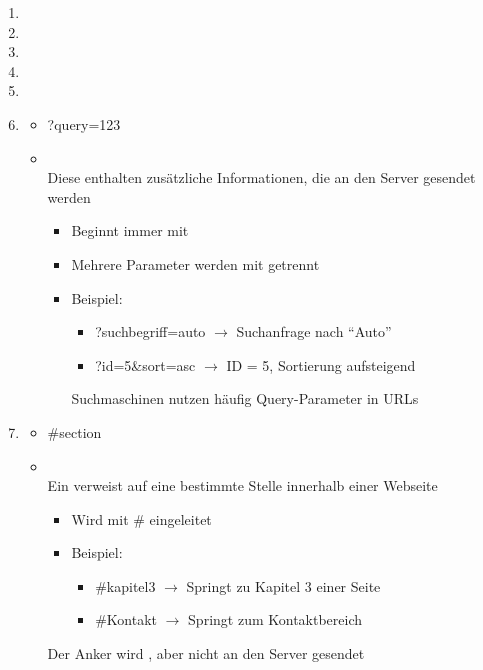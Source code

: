 \begin{infoBox}
    \begin{enumerate}
        \item {}
        \item {}
        \item {}
        \item {}
        \item {}
        \item {}
        \begin{itemize}
            \item {} ?query=123
            \item {}\\
            Diese  enthalten zusätzliche Informationen, die an den Server gesendet werden
            \begin{itemize}
                \item Beginnt immer mit 
                \item Mehrere Parameter werden mit \fatsf{\&} getrennt
                \item Beispiel:
                \begin{itemize}
                    \item ?suchbegriff=auto $\rightarrow$ Suchanfrage nach \enquote{Auto}
                    \item ?id=5\&sort=asc $\rightarrow$ ID = 5, Sortierung aufsteigend
                \end{itemize}
                Suchmaschinen nutzen häufig Query-Parameter in URLs
            \end{itemize}
        \end{itemize}
        \item {}
        \begin{itemize}
            \item {} \#section
            \item {}\\
            Ein  verweist auf eine bestimmte Stelle innerhalb einer Webseite
            \begin{itemize}
                \item Wird mit \# eingeleitet
                \item Beispiel:
                \begin{itemize}
                    \item \#kapitel3 $\rightarrow$ Springt zu Kapitel 3 einer Seite
                    \item \#Kontakt $\rightarrow$ Springt zum Kontaktbereich
                \end{itemize}
            \end{itemize}
            Der Anker wird , aber nicht an den Server gesendet
        \end{itemize}
    \end{enumerate}
\end{infoBox}

